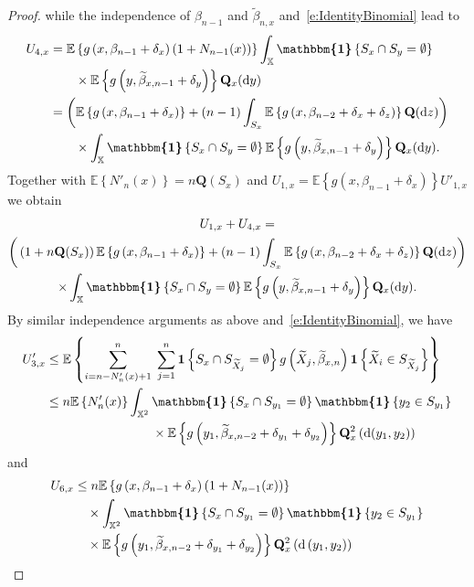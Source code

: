 \documentclass[10pt]{amsart}
\theoremstyle{definition}\newtheorem{defi}[theo]{Definition}\newtheorem{rema}[theo]{Remark}\newtheorem{exam}[theo]{Example}\newtheorem{exem}[theo]{Example}\newtheorem{nota}[theo]{Notation}
\newcommand{\bQ}{\mathbf{Q}}
\newcommand*\X{\mathbb{X}}
\newcommand{\E}{\mathbb{E}}
\newcommand{\bfun}{\mathbf{1}}
\newcommand*\md{\mathrm{d}}
\newcommand{\mean}[1] {\E\left\{{#1}\right\}}
\newcommand{\ind}{\boldsymbol{\mathbbm{1}}}
\begin{document}
\begin{proof}
\noindent while the independence of $\beta_{n-1}$ and $\widetilde{\beta}_{n,x}$ and~\eqref{e:IdentityBinomial} lead to
\begin{align*}
U_{4,x} & = \mean{g\left(x,\beta_{n-1}+\delta_x\right) \left(1+N_{n-1}(x)\right)} \int_{\X} \ind\left\{S_x\cap S_y =\emptyset\right\}\\
&\qquad\times \mean{g\left(y,\widetilde{\beta}_{x,n-1}+\delta_y\right)} \bQ_x(\md y) \\
& = \bigg(\mean{g\left(x,\beta_{n-1}+\delta_x\right)} + (n-1) \int_{S_x} \mean{g\left(x,\beta_{n-2}+\delta_x+\delta_z\right)} \bQ(\md z) \bigg) \\
& \quad \quad \times \int_{\X} \ind\left\{S_x\cap S_y=\emptyset\right\} \mean{g\left(y,\widetilde{\beta}_{x,n-1}+\delta_y\right)} \bQ_x(\md y).
\end{align*}
Together with $\mean{N'_n(x)}=n \bQ(S_x)$ and $U_{1,x}=\mean{g(x,\beta_{n-1}+\delta_x)} U'_{1,x}$ we obtain
\begin{multline}\label{e:U1+U4}
U_{1,x} + U_{4,x} = \\
\bigg(\left(1+n \bQ(S_x)\right) \mean{g\left(x,\beta_{n-1}+\delta_x\right)}
+ (n-1) \int_{S_x} \mean{g\left(x,\beta_{n-2}+\delta_x+\delta_z\right)} \bQ(\md z) \bigg) \\
\times \int_{\X} \ind\left\{S_x\cap S_y=\emptyset\right\} \mean{g\left(y,\widetilde{\beta}_{x,n-1}+\delta_y\right)} \bQ_x(\md y).
\end{multline}
By similar independence arguments as above and~\eqref{e:IdentityBinomial}, we have
\begin{align*}
U'_{3,x} & \leq \mean{ \sum_{i=n-N_n'(x)+1}^n \;\sum_{j=1}^{n} \bfun\left\{ S_x \cap S_{\widetilde{X}_j}=\emptyset\right\} g\left(\widetilde{X}_j,\widetilde{\beta}_{x,n}\right) \bfun\left\{\widetilde{X}_i \in S_{\widetilde{X}_j} \right\}} \\
& \leq n \mean{N_n'(x)} \int_{\X^2} \ind\left\{S_x\cap S_{y_1}=\emptyset\right\} \ind\left\{y_2\in S_{y_1}\right\} \\
&\mkern150mu \times\mean{g\left(y_1,\widetilde{\beta}_{x,n-2}+\delta_{y_1}+\delta_{y_2}\right)} \bQ_x^2\left(\md(y_1,y_2)\right)
\end{align*}
and
\begin{align*}
U_{6,x} & \leq n \mean{g\left(x,\beta_{n-1}+\delta_x\right) \left(1+N_{n-1}(x)\right) } \\
& \quad \times \int_{\X^2} \ind\left\{S_x\cap S_{y_1}=\emptyset\right\} \ind\left\{ y_2\in S_{y_1}\right\}\\
&\quad\times\mean{g\left(y_1,\widetilde{\beta}_{x,n-2}+\delta_{y_1}+\delta_{y_2}\right)} \bQ^2_x\left(\md\left(y_1,y_2\right)\right) \\

\end{align*}
\end{proof}
\end{document}
